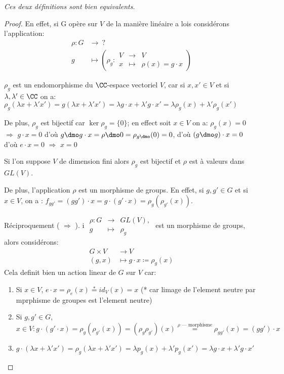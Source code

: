 \emph{Ces deux définitions sont bien equivalents}.
\begin{proof}
En effet, si G opère sur $V$ de la manière linéaire a lois considérons l'application:
\begin{align*}	
	\rho:G &\rightarrow \ ? \\
	g &\mapsto  \left(\rho_g:\begin{array}{rcl}V&\rightarrow& V \\ x&\mapsto&\rho(x)=g\cdot x\end{array}\right)
\end{align*}

$\rho_g$ est un endomorphisme du $\CC$-espace vectoriel $V$, car si $x,x'\in V$ et si $\lambda, \lambda'\in \CC$ on a:
$\rho_g(\lambda x + \lambda' x')=g(\lambda x+\lambda' x')=\lambda g\cdot x+\lambda'g\cdot x'=\lambda\rho_g(x)+\lambda'\rho_g(x')$

De plus, $\rho_g$ est bijectif car $\ker\rho_g=\{0\}$; en effect soit $x\in V$ on a: $\rho_g(x)=0$  $\Rightarrow$  $g\cdot x=0$ d'où $g\dmo g\cdot x= \rho\dmo 0=\rho_{g\dmo}(0)=0$,
d'où $(g\dmo g)\cdot x=0$ d'où $e\cdot x=0$  $\Rightarrow$  $x=0$

Si l'on suppose $V$ de dimension fini alors $\rho_g$ est bijectif et $\rho$ est à valeurs dans $GL(V)$.

De plus, l'application $\rho$ est un morphisme de groups. En effet, si $g,g'\in G$ et si $x\in V$, on a : $f_{gg'}=(gg')\cdot x= g\cdot (g'\cdot x)=\rho_g(\rho_{g'}(x))$.

Réciproquement ( $\Rightarrow$ ).
i $\begin{array}{rcl}\rho: G &\rightarrow & GL(V),\\ g &\mapsto &\rho_g\end{array}$ est un morphisme de groups, alors considérons: 
\begin{align*}
G\times V &\rightarrow  V\\ (g,x) &\mapsto g\cdot x\coloneq\rho_g(x)
\end{align*}
Cela definit bien un action linear de $G$ sur $V$ car:
\begin{enumerate}
	\item Si $x\in V$, $e\cdot x=\rho_e(x) \overset\ast= id_V(x)=x$ (* car limage de l'element neutre par mprphisme de groupes est l'element neutre)
	\item Si $g,g'\in G$, $x\in V: g\cdot(g'\cdot x)=\rho_g(\rho_{g'}(x))=(\rho_g\rho_{g'})(x)\overset{\rho\text{ --- morphisme}}{=}\rho_{gg'}(x)=(gg')\cdot x$
	\item $g\cdot (\lambda x+\lambda'x')=\rho_g(\lambda x+\lambda' x')= \lambda p_g(x)+\lambda' p_g(x')=\lambda g\cdot x+\lambda'g\cdot x'$
\end{enumerate}
\end{proof}

